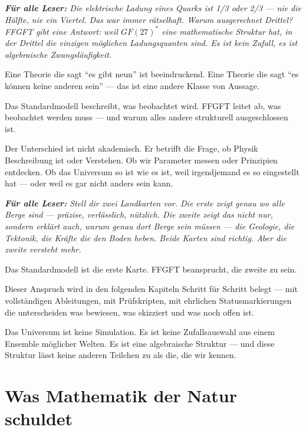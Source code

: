 \documentclass[11pt,oneside]{book}
\newenvironment{laierspur}{%
  \par\vspace{4pt}%
  \noindent\small\itshape\color{blue!60!black}%
  \textbf{Für alle Leser:}\enspace\ignorespaces}{%
  \par\vspace{4pt}\normalsize\normalfont\normalcolor}
\begin{document}
\begin{laierspur}
Die elektrische Ladung eines Quarks ist 1/3 oder 2/3 — nie
die Hälfte, nie ein Viertel. Das war immer rätselhaft. Warum ausgerechnet
Drittel? FFGFT gibt eine Antwort: weil $GF(27)^*$ eine mathematische Struktur
hat, in der Drittel die einzigen möglichen Ladungsquanten sind. Es ist kein
Zufall, es ist algebraische Zwangsläufigkeit.
\end{laierspur}

Eine Theorie die sagt \enquote{es gibt neun} ist beeindruckend.
Eine Theorie die sagt \enquote{es können keine anderen sein} — das ist eine andere
Klasse von Aussage.


Das Standardmodell beschreibt, was beobachtet wird. FFGFT leitet ab, was
beobachtet werden muss — und warum alles andere strukturell ausgeschlossen
ist.


Der Unterschied ist nicht akademisch. Er betrifft die Frage, ob Physik
Beschreibung ist oder Verstehen. Ob wir Parameter messen oder Prinzipien
entdecken. Ob das Universum so ist wie es ist, weil irgendjemand es so
eingestellt hat — oder weil es gar nicht anders sein kann.


\begin{laierspur}
Stell dir zwei Landkarten vor. Die erste zeigt genau wo alle
Berge sind — präzise, verlässlich, nützlich. Die zweite zeigt das nicht
nur, sondern erklärt auch, warum genau dort Berge sein müssen — die
Geologie, die Tektonik, die Kräfte die den Boden heben. Beide Karten sind
richtig. Aber die zweite versteht mehr.
\end{laierspur}

Das Standardmodell ist die erste Karte. FFGFT beansprucht, die zweite zu
sein.


Dieser Anspruch wird in den folgenden Kapiteln Schritt für Schritt belegt —
mit vollständigen Ableitungen, mit Prüfskripten, mit ehrlichen
Statusmarkierungen die unterscheiden was bewiesen, was skizziert und was
noch offen ist.


Das Universum ist keine Simulation. Es ist keine Zufallsauswahl aus einem
Ensemble möglicher Welten. Es ist eine algebraische Struktur — und diese
Struktur lässt keine anderen Teilchen zu als die, die wir kennen.








\chapter{Was Mathematik der Natur schuldet}
\end{document}
